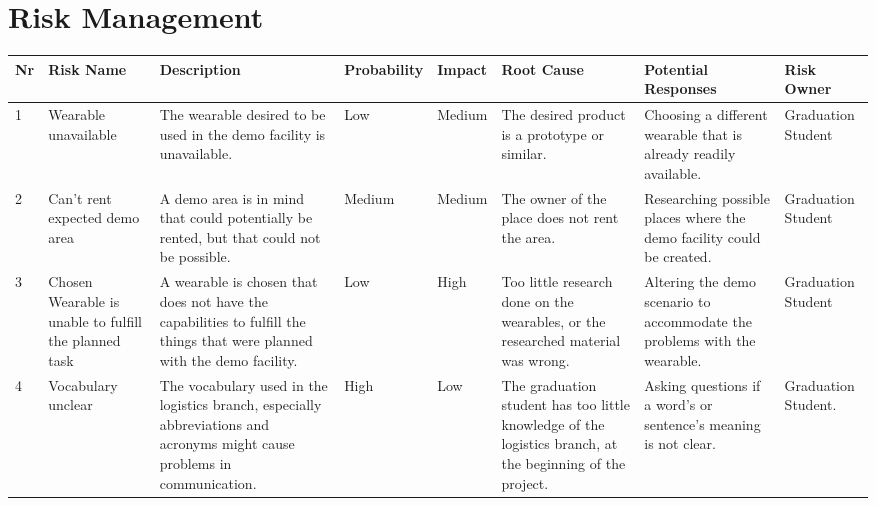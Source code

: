 \chapter{Risk Management}\label{cha:riskManagement}
\begin{table}[htbp]
\centering
\begin{tabular}{|p{.03\linewidth}|p{.22\linewidth}|p{.12\linewidth}|p{.13\linewidth}|p{.1\linewidth}|p{.1\linewidth}|p{.19\linewidth}|p{.1\linewidth}|}
\hline
\textbf{Nr} & \textbf{Risk Name}                                    & \textbf{Description}                                                                                                      & \textbf{Probability} & \textbf{Impact} & \textbf{Root Cause}                                                                                       & \textbf{Potential Responses}                                              & \textbf{Risk Owner} \\ \hline
1           & Wearable unavailable                                  & The wearable desired to be used in the demo facility is unavailable.                                                      & Low                  & Medium          & The desired product is a prototype or similar.                                                            & Choosing a different wearable that is already readily available.          & Graduation Student  \\ \hline
2           & Can't rent expected demo area                         & A demo area is in mind that could potentially be rented, but that could not be possible.                                  & Medium               & Medium          & The owner of the place does not rent the area.                                                            & Researching possible places where the demo facility could be created.     & Graduation Student  \\ \hline
3           & Chosen Wearable is unable to fulfill the planned task & A wearable is chosen that does not have the capabilities to fulfill the things that were planned with the demo facility.  & Low                  & High            & Too little research done on the wearables, or the researched material was wrong.                          & Altering the demo scenario to accommodate the problems with the wearable. & Graduation Student  \\ \hline
4           & Vocabulary unclear                                    & The vocabulary used in the logistics branch, especially abbreviations and acronyms might cause problems in communication. & High                 & Low             & The graduation student has too little knowledge of the logistics branch, at the beginning of the project. & Asking questions if a word's or sentence's meaning is not clear.          & Graduation Student. \\ \hline

\end{tabular}
\end{table}
